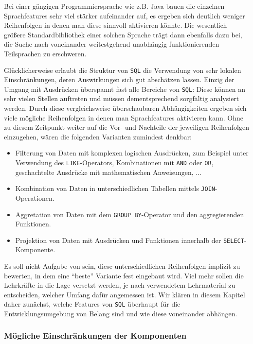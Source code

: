 Bei einer gängigen Programmiersprache wie z.B. Java bauen die einzelnen Sprachfeatures sehr viel stärker aufeinander auf, es ergeben sich deutlich weniger Reihenfolgen in denen man diese sinnvoll aktivieren könnte. Die wesentlich größere Standardbibliothek einer solchen Sprache trägt dann ebenfalls dazu bei, die Suche nach voneinander weitestgehend unabhängig funktionierenden Teilsprachen zu erschweren.

Glücklicherweise erlaubt die Struktur von \texttt{SQL} die Verwendung von sehr lokalen Einschränkungen, deren Auswirkungen sich gut abschätzen lassen. Einzig der Umgang mit Ausdrücken überspannt fast alle Bereiche von \texttt{SQL}: Diese können an sehr vielen Stellen auftreten und müssen dementsprechend sorgfältig analysiert werden. Durch diese vergleichsweise überschaubaren Abhängigkeiten ergeben sich viele mögliche Reihenfolgen in denen man Sprachfeatures aktivieren kann. Ohne zu diesem Zeitpunkt weiter auf die Vor- und Nachteile der jeweiligen Reihenfolgen einzugehen, wären die folgenden Varianten zumindest denkbar:

\begin{itemize}[noitemsep]
  \item Filterung von Daten mit komplexen logischen Ausdrücken, zum Beispiel unter Verwendung des \texttt{LIKE}-Operators, Kombinationen mit \texttt{AND} oder \texttt{OR}, geschachtelte Ausdrücke mit mathematischen Anweisungen, ...
  \item Kombination von Daten in unterschiedlichen Tabellen mittels \texttt{JOIN}-Operationen.
  \item Aggretation von Daten mit dem \texttt{GROUP BY}-Operator und den aggregierenden Funktionen.
  \item Projektion von Daten mit Ausdrücken und Funktionen innerhalb der \texttt{SELECT}-Komponente.
\end{itemize}

Es soll nicht Aufgabe von \idename{} sein, diese unterschiedlichen Reihenfolgen implizit zu bewerten, in dem eine "`beste"' Variante fest eingebaut wird. Viel mehr sollen die Lehrkräfte in die Lage versetzt werden, je nach verwendetem Lehrmaterial zu entscheiden, welcher Umfang dafür angemessen ist. Wir klären in diesem Kapitel daher zunächst, welche Features von \texttt{SQL} überhaupt für die Entwicklungsumgebung von Belang sind und wie diese voneinander abhängen.

\subsubsection{Mögliche Einschränkungen der Komponenten}
\label{sec:sql-subset-local}

